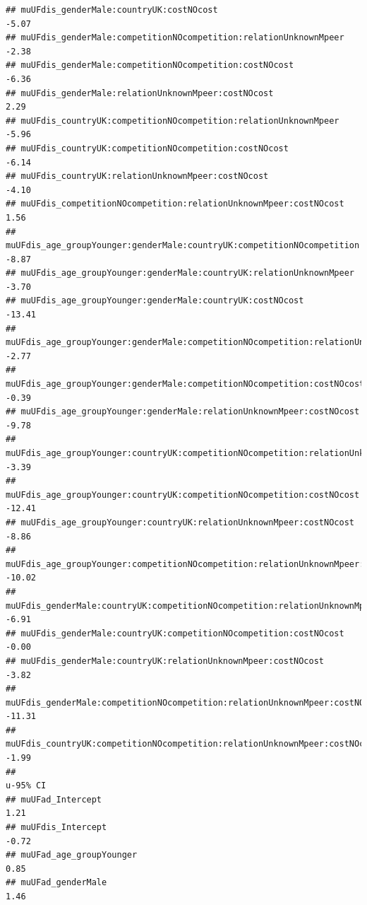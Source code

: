 \documentclass[
]{article}
\begin{document}
\begin{verbatim}
## muUFdis_genderMale:countryUK:costNOcost                                              -5.07
## muUFdis_genderMale:competitionNOcompetition:relationUnknownMpeer                     -2.38
## muUFdis_genderMale:competitionNOcompetition:costNOcost                               -6.36
## muUFdis_genderMale:relationUnknownMpeer:costNOcost                                    2.29
## muUFdis_countryUK:competitionNOcompetition:relationUnknownMpeer                      -5.96
## muUFdis_countryUK:competitionNOcompetition:costNOcost                                -6.14
## muUFdis_countryUK:relationUnknownMpeer:costNOcost                                    -4.10
## muUFdis_competitionNOcompetition:relationUnknownMpeer:costNOcost                      1.56
## muUFdis_age_groupYounger:genderMale:countryUK:competitionNOcompetition               -8.87
## muUFdis_age_groupYounger:genderMale:countryUK:relationUnknownMpeer                   -3.70
## muUFdis_age_groupYounger:genderMale:countryUK:costNOcost                            -13.41
## muUFdis_age_groupYounger:genderMale:competitionNOcompetition:relationUnknownMpeer    -2.77
## muUFdis_age_groupYounger:genderMale:competitionNOcompetition:costNOcost              -0.39
## muUFdis_age_groupYounger:genderMale:relationUnknownMpeer:costNOcost                  -9.78
## muUFdis_age_groupYounger:countryUK:competitionNOcompetition:relationUnknownMpeer     -3.39
## muUFdis_age_groupYounger:countryUK:competitionNOcompetition:costNOcost              -12.41
## muUFdis_age_groupYounger:countryUK:relationUnknownMpeer:costNOcost                   -8.86
## muUFdis_age_groupYounger:competitionNOcompetition:relationUnknownMpeer:costNOcost   -10.02
## muUFdis_genderMale:countryUK:competitionNOcompetition:relationUnknownMpeer           -6.91
## muUFdis_genderMale:countryUK:competitionNOcompetition:costNOcost                     -0.00
## muUFdis_genderMale:countryUK:relationUnknownMpeer:costNOcost                         -3.82
## muUFdis_genderMale:competitionNOcompetition:relationUnknownMpeer:costNOcost         -11.31
## muUFdis_countryUK:competitionNOcompetition:relationUnknownMpeer:costNOcost           -1.99
##                                                                                   u-95% CI
## muUFad_Intercept                                                                      1.21
## muUFdis_Intercept                                                                    -0.72
## muUFad_age_groupYounger                                                               0.85
## muUFad_genderMale                                                                     1.46

\end{verbatim}
\end{document}
